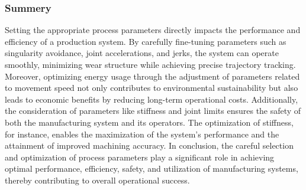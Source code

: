 \subsubsection{Summery}
Setting the appropriate process parameters directly impacts the performance and efficiency of a production system. By carefully fine-tuning parameters such as singularity avoidance, joint accelerations, and jerks, the system can operate smoothly, minimizing wear structure while achieving precise trajectory tracking. Moreover, optimizing energy usage through the adjustment of parameters related to movement speed not only contributes to environmental sustainability but also leads to economic benefits by reducing long-term operational costs. Additionally, the consideration of parameters like stiffness and joint limits ensures the safety of both the manufacturing system and its operators. The optimization of stiffness, for instance, enables the maximization of the system's performance and the attainment of improved machining accuracy. In conclusion, the careful selection and optimization of process parameters play a significant role in achieving optimal performance, efficiency, safety, and utilization of manufacturing systems, thereby contributing to overall operational success.